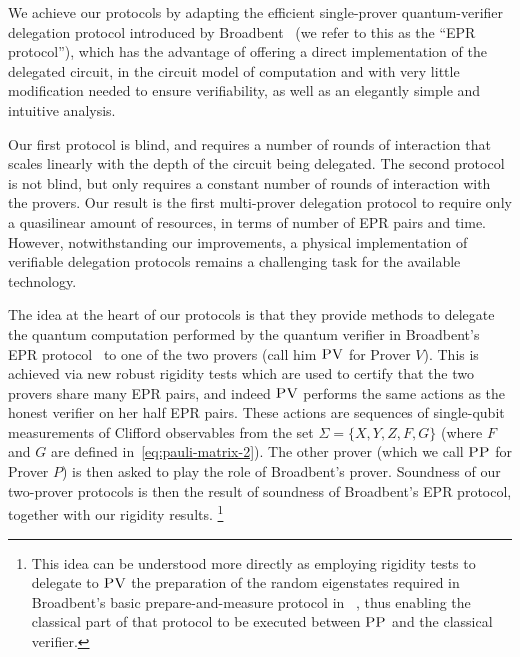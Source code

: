 \documentclass{toc}
\newcommand{\pv}{\textsc{PV}}
\newcommand{\pp}{\textsc{PP}}
\begin{document}
We achieve our protocols by adapting the efficient single-prover quantum-verifier delegation
protocol introduced by Broadbent~\cite{broadbent15howtoverify} (we refer to this as the ``EPR protocol''), which has the advantage of offering a direct implementation of the delegated circuit, in the circuit model of computation and with very little modification needed to ensure verifiability, as well as an elegantly simple and intuitive analysis. 
 
Our first protocol is blind, and requires a number of rounds of interaction that
scales linearly with the depth of the circuit being delegated. The second
protocol is not blind, but only requires a constant number of rounds of
interaction with the provers. Our %
result is %
the first multi-prover delegation protocol to require only a quasilinear amount of resources, in terms of number of EPR pairs and time. However, notwithstanding our improvements, a physical implementation  of verifiable delegation protocols remains a challenging task for the available technology.
 




The idea at the heart of our protocols is that they provide methods to delegate the quantum computation performed by the quantum verifier in Broadbent's EPR protocol~\cite{broadbent15howtoverify} to one of the two provers (call him $\pv$ for Prover $V$). This is achieved via new robust rigidity tests which are used to certify that the two provers share many EPR pairs, and indeed $\pv$ performs the same actions as the honest verifier on her half EPR pairs. These actions are sequences of single-qubit measurements of Clifford observables from the set $\Sigma = \{X,Y,Z,F,G\}$ (where $F$ and $G$ are defined in~\eqref{eq:pauli-matrix-2}). The other prover (which we call $\pp$ for Prover $P$) is then asked to play the role of Broadbent's prover. Soundness of our two-prover protocols is then the result of soundness of Broadbent's EPR protocol, together with our rigidity results. \footnote{This idea can  be understood more directly as employing rigidity tests to delegate to $\pv$ the preparation of the random eigenstates required in Broadbent's basic prepare-and-measure protocol in~ \cite{broadbent15howtoverify}, thus enabling the classical part of that protocol to be executed between $\pp$ and the classical verifier.}
\end{document}
